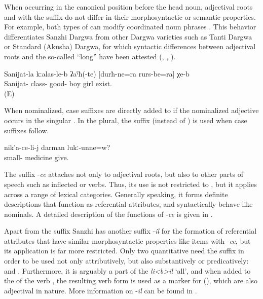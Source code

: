 When occurring in the canonical position before the head noun, adjectival roots and  with the suffix  do not differ in their morphosyntactic or semantic properties. For example, both types of  can modify coordinated noun phrases . This behavior differentiates Sanzhi Dargwa from other Dargwa varieties such as Tanti Dargwa or Standard (Akusha) Dargwa, for which syntactic differences between adjectival roots and the so-called ``long''  have been attested (\citealp[26]{vandenBerg2001}, \citealp[207]{AbdullaevEtAl2014}, \citealp{Lander2014}).
%
\begin{exe}
	\ex	\label{ex:In Sanijats class there are good}
	\gll	Sanijat-la	kːalas-le-b	ʡaˁħ(-te)	[durħ-ne=ra	rurs-be=ra]	χe-b\\
		Sanijat-	class-	good- 	boy\tsc{-pl=add}	girl	exist. \\
	‎\glt	‎‎ (E)
\end{exe}

When nominalized, case suffixes are directly added to  if the nominalized adjective occurs in the singular . In the plural, the suffix  (instead of ) is used when case suffixes follow.
%
\begin{exe}
	\ex	\label{ex:Does he give medicine to the little one}
	\gll	nik'a-ce-li-j	darman	lukː-unne=w? \\
		small-	medicine	give. \\
	\glt	{}
\end{exe}


The suffix -\textit{ce} attaches not only to adjectival roots, but also to other parts of speech such as inflected  or verbs. Thus, its use is not restricted to , but it applies across a range of lexical categories. Generally speaking, it forms definite descriptions that function as referential attributes, and syntactically behave like nominals. A detailed description of the functions of -\textit{ce} is given in .

Apart from the suffix  Sanzhi has another suffix -\textit{il} for the formation of referential attributes that have similar morphosyntactic properties like items with -\textit{ce}, but its application is far more restricted. Only two quantitative  need the suffix  in order to be used not only attributively, but also substantively or predicatively:   and  . Furthermore, it is arguably a part of the  \textit{li<b>il} `all', and when added to the  of the verb  , the resulting verb form is used as a marker for  (), which are also adjectival in nature. More information on -\textit{il} can be found in .



